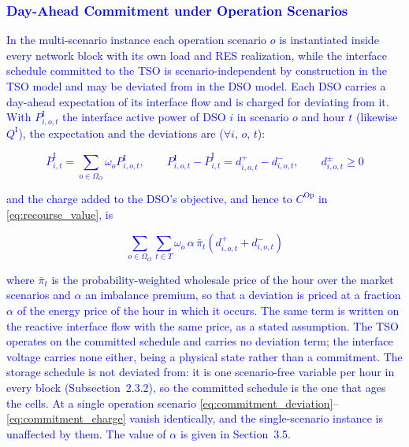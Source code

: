

\subsubsection{\textcolor{blue}{Day-Ahead Commitment under Operation Scenarios}}
\label{subsubsec:commitment}

\textcolor{blue}{In the multi-scenario instance each operation scenario $o$ is instantiated inside every network
block with its own load and RES realization, while the interface schedule committed to the TSO is
scenario-independent by construction in the TSO model and may be deviated from in the DSO model. Each DSO
carries a day-ahead expectation of its interface flow and is charged for deviating from it. With
$P^{\text{I}}_{i,o,t}$ the interface active power of DSO $i$ in scenario $o$ and hour $t$ (likewise
$Q^{\text{I}}$), the expectation and the deviations are ($\forall i$, $o$, $t$):}

\textcolor{blue}{
    \begin{equation}
        \bar{P}^{\text{I}}_{i,t} = \sum_{o \in \Omega_O} \omega_o P^{\text{I}}_{i,o,t}, \qquad
        P^{\text{I}}_{i,o,t} - \bar{P}^{\text{I}}_{i,t} = d^{+}_{i,o,t} - d^{-}_{i,o,t}, \qquad d^{\pm}_{i,o,t} \ge 0
        \label{eq:commitment_deviation}
    \end{equation}
}

\textcolor{blue}{and the charge added to the DSO's objective, and hence to $C^{\text{Op}}$ in
\eqref{eq:recourse_value}, is}

\textcolor{blue}{
    \begin{equation}
        \sum_{o \in \Omega_O} \sum_{t \in T} \omega_o \, \alpha \, \bar{\pi}_t
        \left( d^{+}_{i,o,t} + d^{-}_{i,o,t} \right)
        \label{eq:commitment_charge}
    \end{equation}
}

\noindent
\textcolor{blue}{where $\bar{\pi}_t$ is the probability-weighted wholesale price of the hour over the market
scenarios and $\alpha$ an imbalance premium, so that a deviation is priced at a fraction $\alpha$ of the energy
price of the hour in which it occurs. The same term is written on the reactive interface flow with the same
price, as a stated assumption. The TSO operates on the committed schedule and carries no deviation term; the
interface voltage carries none either, being a physical state rather than a commitment. The storage schedule
is not deviated from: it is one scenario-free variable per hour in every block
(Subsection~2.3.2), so the committed schedule is the one that ages the cells. At a single operation scenario
\eqref{eq:commitment_deviation}--\eqref{eq:commitment_charge} vanish identically, and the single-scenario
instance is unaffected by them. The value of $\alpha$ is given in Section~3.5.}

